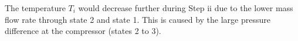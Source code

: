 The temperature \( T_i \) would decrease further during Step ii due to the lower mass flow rate through state 2 and state 1. This is caused by the large pressure difference at the compressor (states 2 to 3).